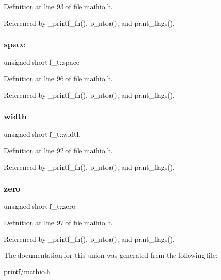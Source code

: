 Definition at line 93 of file mathio.\+h.



Referenced by \+\_\+printf\+\_\+fn(), p\+\_\+ntoa(), and print\+\_\+flags().

\mbox{\label{unionf__t_aba20a97e95d14a076e9c175989022717}} 
\subsubsection{\texorpdfstring{space}{space}}
{\footnotesize\ttfamily unsigned short f\+\_\+t\+::space}



Definition at line 96 of file mathio.\+h.



Referenced by \+\_\+printf\+\_\+fn(), p\+\_\+ntoa(), and print\+\_\+flags().

\mbox{\label{unionf__t_ad6b1584314c27653690552e95e1ed96f}} 
\subsubsection{\texorpdfstring{width}{width}}
{\footnotesize\ttfamily unsigned short f\+\_\+t\+::width}



Definition at line 92 of file mathio.\+h.



Referenced by \+\_\+printf\+\_\+fn(), p\+\_\+ntoa(), and print\+\_\+flags().

\mbox{\label{unionf__t_ac70397e87721255908299c190f3e5670}} 
\subsubsection{\texorpdfstring{zero}{zero}}
{\footnotesize\ttfamily unsigned short f\+\_\+t\+::zero}



Definition at line 97 of file mathio.\+h.



Referenced by \+\_\+printf\+\_\+fn(), p\+\_\+ntoa(), and print\+\_\+flags().



The documentation for this union was generated from the following file\+:\begin{DoxyCompactItemize}
\item 
printf/\hyperlink{mathio_8h}{mathio.\+h}\end{DoxyCompactItemize}
